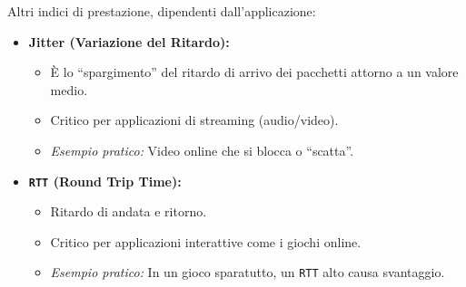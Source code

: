 Altri indici di prestazione, dipendenti dall'applicazione:
\begin{itemize}
    \item \textbf{Jitter (Variazione del Ritardo):}
    \begin{itemize}
        \item È lo “spargimento” del ritardo di arrivo dei pacchetti attorno a un valore medio.
        \item Critico per applicazioni di streaming (audio/video).
        \item \textit{Esempio pratico:} Video online che si blocca o “scatta”.
    \end{itemize}
    \item \textbf{\texttt{RTT} (Round Trip Time):}
    \begin{itemize}
        \item Ritardo di andata e ritorno.
        \item Critico per applicazioni interattive come i giochi online.
        \item \textit{Esempio pratico:} In un gioco sparatutto, un \texttt{RTT} alto causa svantaggio.
    \end{itemize}
\end{itemize}

